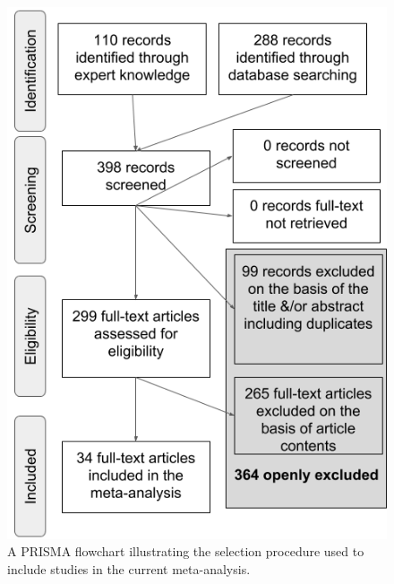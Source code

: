 \documentclass[man, noextraspace]{apa6}
\begin{document}
\begin{figure}
\includegraphics[width=1\linewidth]{figures/Figure_1_PRISMA_MA_Mispronunciation} \caption{A PRISMA flowchart illustrating the selection procedure used to include studies in the current meta-analysis.}\label{fig:PRISMA-image}
\end{figure}
\end{document}
